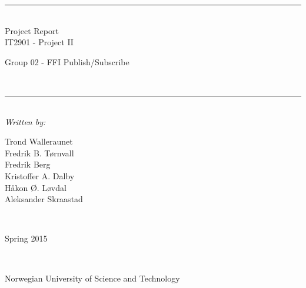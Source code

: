 \thispagestyle{empty}
\begin{center}
\noindent\rule{\textwidth}{0.5pt}
\\[1pc]
\Huge{Project Report}
\\[1pc]
\large{IT2901 - Project II}
\\[2pc]
\begin{small}
\begin{bf}Group 02 - FFI Publish/Subscribe\end{bf}
\end{small}
\\[1pc]
\noindent\rule{\textwidth}{0.5pt}
\\[4pc]
\textit{Written by:}
\\[1pc]
\begin{small}
Trond Walleraunet\\Fredrik B. Tørnvall\\Fredrik Berg\\Kristoffer A. Dalby\\Håkon Ø. Løvdal \\Aleksander Skraastad
\end{small}
\\[7pc]
\begin{bf}
Spring 2015
\end{bf}
\\[8pc]

\noindent{}

\begin{small}Norwegian University of Science and Technology\end{small}

\end{center}

\pagebreak